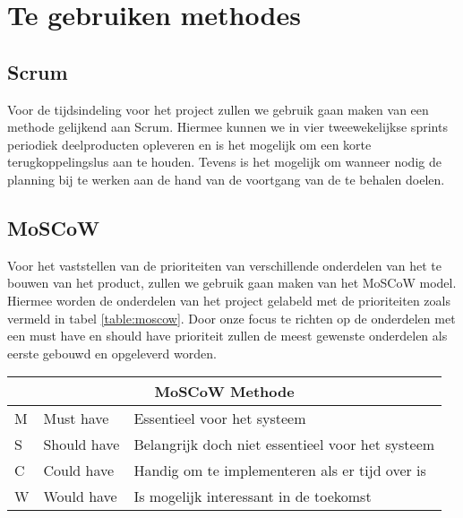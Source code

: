\section{Te gebruiken methodes}

\subsection{Scrum}
Voor de tijdsindeling voor het project zullen we gebruik gaan maken van een methode gelijkend aan Scrum. Hiermee kunnen we in vier tweewekelijkse sprints periodiek deelproducten opleveren en is het mogelijk om een korte terugkoppelingslus aan te houden. Tevens is het mogelijk om wanneer nodig de planning bij te werken aan de hand van de voortgang van de te behalen doelen. 

\subsection{MoSCoW}
Voor het vaststellen van de prioriteiten van verschillende onderdelen van het te bouwen van het product, zullen we gebruik gaan maken van het MoSCoW model. Hiermee worden de onderdelen van het project gelabeld met de prioriteiten zoals vermeld in tabel \ref{table:moscow}. Door onze focus te richten op de onderdelen met een must have en should have prioriteit zullen de meest gewenste onderdelen als eerste gebouwd en opgeleverd worden.\\[1cm]


{\renewcommand{\arraystretch}{1.5}
	\centering
	
	\begin{tabular}{ | l | l | l | }
		\multicolumn{3}{c}{\bfseries{MoSCoW Methode}} \\ \hline
		M & Must have & Essentieel voor het systeem\\ \hline
		S & Should have & Belangrijk doch niet essentieel voor het systeem \\ \hline
		C & Could have & Handig om te implementeren als er tijd over is \\ \hline
		W & Would have & Is mogelijk interessant in de toekomst \\ \hline 
	\end{tabular}
	\label{table:moscow}
	
}
